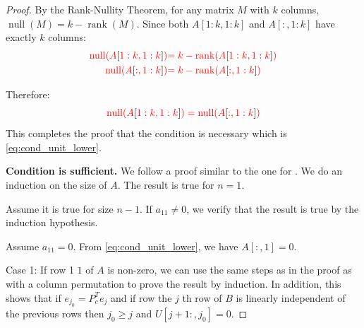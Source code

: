 \documentclass[10pt,twoside]{siamart1116}
\DeclareMathOperator{\rk}{rank}
\DeclareMathOperator{\nl}{null}
\numberwithin{theorem}{section}
\providecommand{\DIFadd}[1]{{\protect\color{blue} \sf #1}} %
\providecommand{\DIFdel}[1]{{\protect\color{red} \scriptsize #1}} %
\providecommand{\DIFaddbegin}{} %
\providecommand{\DIFaddend}{} %
\providecommand{\DIFdelbegin}{} %
\providecommand{\DIFdelend}{} %
\begin{document}
\begin{proof}
\DIFdel{By the Rank-Nullity Theorem, for any matrix $M$ with $k$ columns, $\nl(M) = k - \rk(M)$. Since both $A[1:k, 1:k]$ and $A[:, 1:k]$ have exactly $k$ columns:
	}\begin{align*}
		\DIFdel{\nl(A}[\DIFdel{1:k, 1:k}]\DIFdel{) }& \DIFdel{= k - \rk(A}[\DIFdel{1:k, 1:k}]\DIFdel{) }\\
		\DIFdel{\nl(A}[\DIFdel{:, 1:k}]\DIFdel{)   }& \DIFdel{= k - \rk(A}[\DIFdel{:, 1:k}]\DIFdel{)
	}\end{align*}%

\DIFdel{Therefore:
	}\[ \DIFdel{\nl(A}[\DIFdel{1:k, 1:k}]\DIFdel{) = \nl(A}[\DIFdel{:, 1:k}]\DIFdel{) }\]%
\DIFdel{This completes the proof that the condition is necessary}\DIFdelend \DIFaddbegin \DIFadd{which is }\cref{eq:cond_unit_lower}\DIFaddend .

  \noindent\textbf{Condition is sufficient.} \quad We follow a proof similar to the one for . We do an induction on the size of $A$. The result is true for $n=1$.

  Assume it is true for size $n-1$. If $a_{11} \neq 0$, we verify that the result is true by the induction hypothesis.

  Assume $a_{11} = 0$. From \DIFdelbegin %
\DIFdelend \DIFaddbegin \cref{eq:cond_unit_lower}\DIFaddend , we have $A[:,1] = 0$.

  Case 1: If row \DIFdelbegin \DIFdel{1 }\DIFdelend \DIFaddbegin \DIFadd{$1$ }\DIFaddend of $A$ is non-zero, we can use the same steps as in the proof as  with a column permutation to prove the result by induction. In addition, this shows that if $e_{j_0} = P_c^T e_j$ and if \DIFdelbegin \DIFdel{row }\DIFdelend \DIFaddbegin \DIFadd{the }\DIFaddend $j$\DIFaddbegin \DIFadd{th row }\DIFaddend of $B$ is linearly independent of the previous rows then $j_0 \ge j$ and $U[j+1:,j_0] = 0$.


\end{proof}
\end{document}

